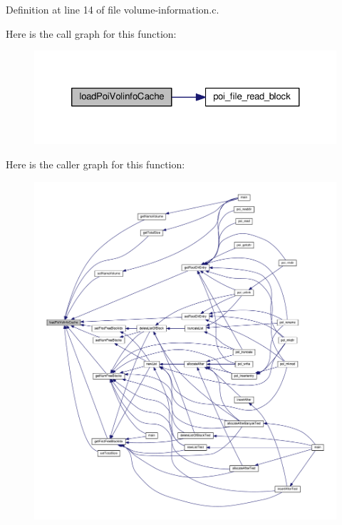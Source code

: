 Definition at line 14 of file volume-\/information.\-c.



Here is the call graph for this function\-:
\nopagebreak
\begin{figure}[H]
\begin{center}
\leavevmode
\includegraphics[width=324pt]{volume-information_8c_af6d08c2f02ba561e21c8aeef199e20f2_cgraph}
\end{center}
\end{figure}




Here is the caller graph for this function\-:
\nopagebreak
\begin{figure}[H]
\begin{center}
\leavevmode
\includegraphics[width=350pt]{volume-information_8c_af6d08c2f02ba561e21c8aeef199e20f2_icgraph}
\end{center}
\end{figure}



